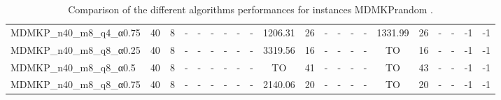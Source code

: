 \begin{sidewaystable}[!ht]
{\begin{tabular}{lcccccccccccccccccccc}
MDMKP\_n40\_m8\_q4\_α0.75 & 40 & 8 &  - &  - &  - &  - &  - &  - &  \textcolor{blue2}{1206.31} & 26 &  - &  - &  - &  - & 1331.99 & 26 &  - &  - & -1 & -1 \\
MDMKP\_n40\_m8\_q8\_α0.25 & 40 & 8 &  - &  - &  - &  - &  - &  - &  \textcolor{blue2}{3319.56} & 16 &  - &  - &  - &  - & TO & 16 &  - &  - & -1 & -1 \\
MDMKP\_n40\_m8\_q8\_α0.5 & 40 & 8 &  - &  - &  - &  - &  - &  - & TO & 41 &  - &  - &  - &  - & TO & 43 &  - &  - & -1 & -1 \\
MDMKP\_n40\_m8\_q8\_α0.75 & 40 & 8 &  - &  - &  - &  - &  - &  - &  \textcolor{blue2}{2140.06} & 20 &  - &  - &  - &  - & TO & 20 &  - &  - & -1 & -1 \\
\bottomrule
\end{tabular}
}%
\caption{Comparison of the different algorithms performances for instances MDMKPrandom .}
\label{tab:table_compare_MDMKPrandom }
\end{sidewaystable}

